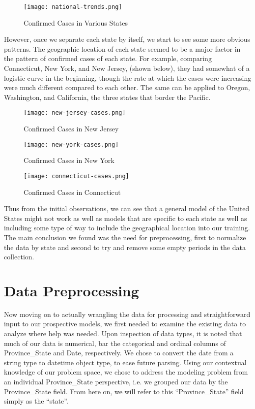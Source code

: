 \documentclass[sigconf]{acmart}
\begin{document}
\begin{figure}
  \centering
  \texttt{[image: national-trends.png]}
  \caption{Confirmed Cases in Various States}
\end{figure}

However, once we separate each state by itself, we start to see some more
obvious patterns. The geographic location of each state seemed to be a major
factor in the pattern of confirmed cases of each state. For example, comparing
Connecticut, New York, and New Jersey, (shown below), they had somewhat of a
logistic curve in the beginning, though the rate at which the cases were
increasing were much different compared to each other. The same can be applied
to Oregon, Washington, and California, the three states that border the
Pacific. 

\begin{figure}
  \centering
  \texttt{[image: new-jersey-cases.png]}
  \caption{Confirmed Cases in New Jersey}
\end{figure}

\begin{figure}
  \texttt{[image: new-york-cases.png]}
  \caption{Confirmed Cases in New York}
\end{figure}

\begin{figure}
  \texttt{[image: connecticut-cases.png]}
  \caption{Confirmed Cases in Connecticut}
\end{figure}

Thus from the initial observations, we can see that a general model of the
United States might not work as well as models that are specific to each state
as well as including some type of way to include the geographical location into
our training. The main conclusion we found was the need for preprocessing,
first to normalize the data by state and second to try and remove some empty
periods in the data collection.

\section{Data Preprocessing}

Now moving on to actually wrangling the data for processing and straightforward
input to our prospective models, we first needed to examine the existing data
to analyze where help was needed. Upon inspection of data types, it is noted
that much of our data is numerical, bar the categorical and ordinal columns of
Province\_State and Date, respectively. We chose to convert the date from a
string type to datetime object type, to ease future parsing. Using our
contextual knowledge of our problem space, we chose to address the modeling
problem from an individual Province\_State perspective, i.e. we grouped our
data by the Province\_State field. From here on, we will refer to this
“Province\_State” field simply as the “state”. 
\end{document}
